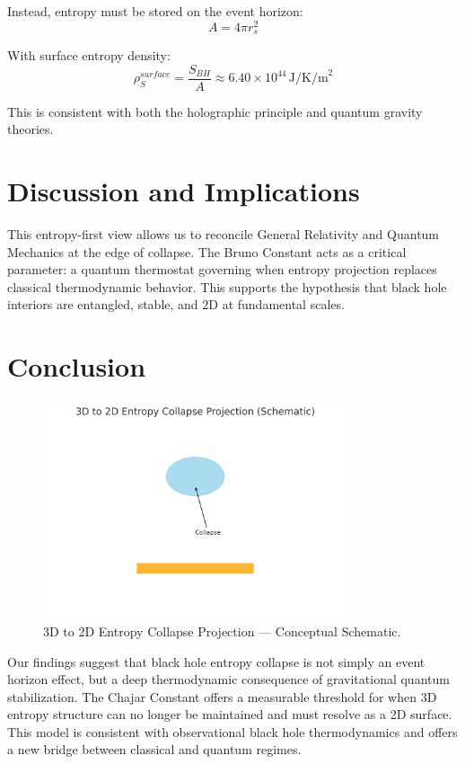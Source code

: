 \documentclass[12pt]{article}
\begin{document}
Instead, entropy must be stored on the event horizon:
\begin{equation}
A = 4\pi r_s^2
\end{equation}

With surface entropy density:
\begin{equation}
\rho_S^{surface} = \frac{S_{BH}}{A} \approx 6.40 \times 10^{44} \, \text{J/K/m}^2
\end{equation}

This is consistent with both the holographic principle and quantum gravity theories.

\section{Discussion and Implications}
This entropy-first view allows us to reconcile General Relativity and Quantum Mechanics at the edge of collapse. The Bruno Constant acts as a critical parameter: a quantum thermostat governing when entropy projection replaces classical thermodynamic behavior. This supports the hypothesis that black hole interiors are entangled, stable, and 2D at fundamental scales.

\section{Conclusion}

\begin{figure}[H]
    \centering
    \includegraphics[width=0.8\textwidth]{fig_08_final_projection.png}
    \caption{3D to 2D Entropy Collapse Projection — Conceptual Schematic.}
    \label{fig:final_projection}
\end{figure}


Our findings suggest that black hole entropy collapse is not simply an event horizon effect, but a deep thermodynamic consequence of gravitational quantum stabilization. The Chajar Constant offers a measurable threshold for when 3D entropy structure can no longer be maintained and must resolve as a 2D surface. This model is consistent with observational black hole thermodynamics and offers a new bridge between classical and quantum regimes.
\end{document}

